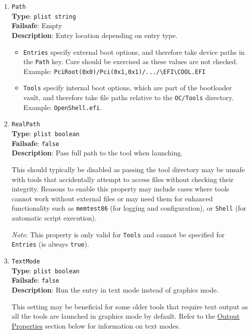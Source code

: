\documentclass[]{article}
\providecommand{\tightlist}{%
  \setlength{\itemsep}{0pt}\setlength{\parskip}{0pt}}
\begin{document}
\begin{enumerate}
\item
  \texttt{Path}\\
  \textbf{Type}: \texttt{plist\ string}\\
  \textbf{Failsafe}: Empty\\
  \textbf{Description}: Entry location depending on entry type.

  \begin{itemize}
  \tightlist
  \item \texttt{Entries} specify external boot options, and therefore take device
  paths in the \texttt{Path} key. Care should be exercised as these values are not checked.
  Example: \texttt{PciRoot(0x0)/Pci(0x1,0x1)/.../\textbackslash EFI\textbackslash COOL.EFI}
  \item \texttt{Tools} specify internal boot options, which are part of the bootloader
  vault, and therefore take file paths relative to the \texttt{OC/Tools} directory.
  Example: \texttt{OpenShell.efi}.
  \end{itemize}

\item
  \texttt{RealPath}\\
  \textbf{Type}: \texttt{plist\ boolean}\\
  \textbf{Failsafe}: \texttt{false}\\
  \textbf{Description}: Pass full path to the tool when launching.

  This should typically be disabled as passing the tool directory may be unsafe with
  tools that accidentally attempt to access files without checking their integrity.
  Reasons to enable this property may include cases where tools cannot work
  without external files or may need them for enhanced functionality such as
  \texttt{memtest86} (for logging and configuration), or \texttt{Shell} (for
  automatic script execution).

  \emph{Note}: This property is only valid for \texttt{Tools} and cannot be
  specified for \texttt{Entries} (is always \texttt{true}).

\item
  \texttt{TextMode}\\
  \textbf{Type}: \texttt{plist\ boolean}\\
  \textbf{Failsafe}: \texttt{false}\\
  \textbf{Description}: Run the entry in text mode instead of graphics mode.

  This setting may be beneficial for some older tools that require text output
  as all the tools are launched in graphics mode by default. Refer to the
  \hyperref[uefioutputprops]{Output Properties} section below for information on text modes.

\end{enumerate}
\end{document}
